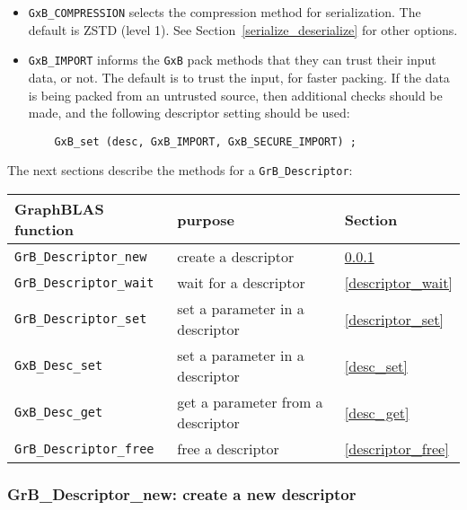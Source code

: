 \documentclass[12pt]{article}
\begin{document}
\begin{itemize}
\item \verb'GxB_COMPRESSION' selects the compression method for serialization.
    The default is ZSTD (level 1).  See Section~\ref{serialize_deserialize} for
    other options.

\item \verb'GxB_IMPORT' informs the \verb'GxB' pack methods
    that they can trust their input data, or not.  The default is to trust
    the input, for faster packing.  If the data is being packed from an
    untrusted source, then additional checks should be made, and the 
    following descriptor setting should be used:

    {\footnotesize
    \begin{verbatim}
    GxB_set (desc, GxB_IMPORT, GxB_SECURE_IMPORT) ; \end{verbatim}}

\end{itemize}

The next sections describe the methods for a \verb'GrB_Descriptor':

\vspace{0.2in}
{\footnotesize
\begin{tabular}{lll}
\hline
GraphBLAS function   & purpose                                      & Section \\
\hline
\verb'GrB_Descriptor_new'        & create a descriptor                  & \ref{descriptor_new} \\
\verb'GrB_Descriptor_wait'       & wait for a descriptor                & \ref{descriptor_wait} \\
\verb'GrB_Descriptor_set'        & set a parameter in a descriptor      & \ref{descriptor_set} \\
\verb'GxB_Desc_set'              & set a parameter in a descriptor      & \ref{desc_set}  \\
\verb'GxB_Desc_get'              & get a parameter from a descriptor    & \ref{desc_get}  \\
\verb'GrB_Descriptor_free'       & free a descriptor                    & \ref{descriptor_free} \\
\hline
\end{tabular}
}

\newpage
\subsubsection{{\sf GrB\_Descriptor\_new:}  create a new descriptor}
\label{descriptor_new}
\end{document}
